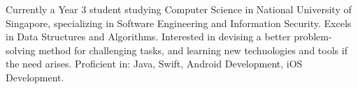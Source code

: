 

\begin{cvparagraph}
Currently a Year 3 student studying Computer Science in National University of Singapore, specializing in Software Engineering and Information Security. Excels in Data Structures and Algorithms. Interested in devising a better problem-solving method for challenging tasks, and learning new technologies and tools if the need arises. Proficient in: Java, Swift, Android Development, iOS Development.
\end{cvparagraph}
